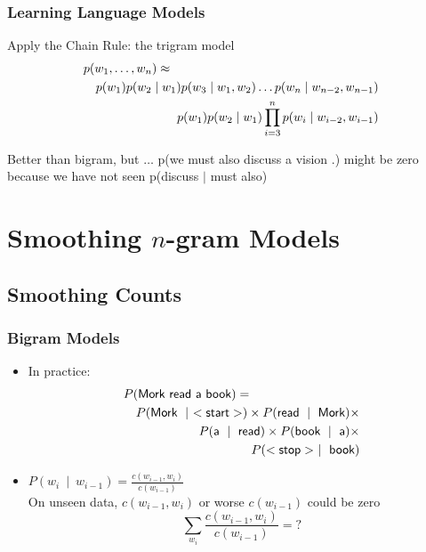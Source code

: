 \begin{frame}
\frametitle{Learning Language Models}
\begin{block}{Apply the Chain Rule: the trigram model}
\begin{eqnarray*}
\lefteqn{p(w_1, \ldots, w_n) \approx} \\
&& p(w_1) p(w_2 \mid w_1) p(w_3 \mid w_1, w_2) \ldots p(w_n \mid w_{n-2}, w_{n-1}) \\
&& p(w_1) p(w_2 \mid w_1) \prod_{i=3}^n p(w_i \mid w_{i-2}, w_{i-1})
\end{eqnarray*}
\end{block}
\pause
\begin{block}{Better than bigram, but $\ldots$}
p(\textsf{we must also discuss a vision .}) might be zero because we have not seen p(discuss $\mid$ must also)
\end{block}
\end{frame}

\section{Smoothing $n$-gram Models}
\frame{\tableofcontents[currentsection]}
\subsection{Smoothing Counts}

\begin{frame}
\frametitle{Bigram Models}
\begin{itemize}[<+->]
\item
In practice: 
\begin{eqnarray*}
\lefteqn{P(\textsf{Mork read a book})=}\\
&& P(\textsf{Mork}~\mid~<\textsf{start}>) \times P(\textsf{read}~\mid~\textsf{Mork}) \times \\
&& P(\textsf{a}~\mid~\textsf{read}) \times P(\textsf{book}~\mid~\textsf{a}) \times \\
&& P(<\textsf{stop}>~\mid~\textsf{book})
\end{eqnarray*}

\item $P(w_i~\mid~w_{i-1}) = \frac{ c(w_{i-1},w_i) } { c(w_{i-1}) }$ \\
 On unseen data, $c(w_{i-1},w_i)$ or worse $c(w_{i-1})$ could be zero
\[ \sum_{w_i} \frac{ c(w_{i-1},w_i) } { c(w_{i-1}) } = ? \]

\end{itemize}
\end{frame}


